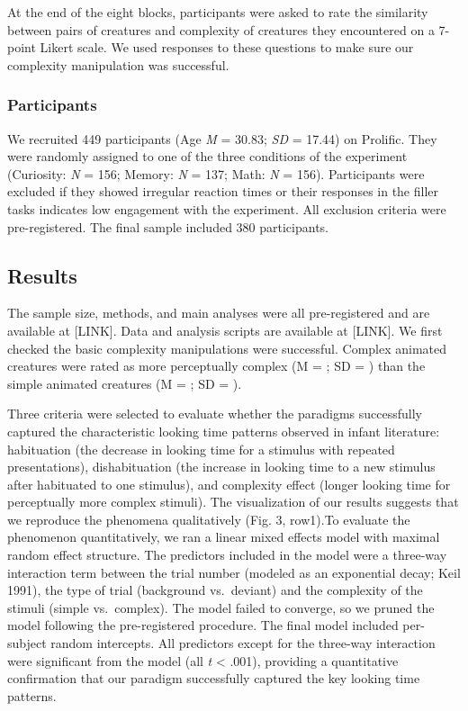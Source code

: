 \documentclass[10pt, letterpaper]{article}
\begin{document}
At the end of the eight blocks, participants were asked to rate the
similarity between pairs of creatures and complexity of creatures they
encountered on a 7-point Likert scale. We used responses to these
questions to make sure our complexity manipulation was successful.

\hypertarget{participants}{%
\subsubsection{Participants}\label{participants}}

We recruited 449 participants (Age \emph{M} = 30.83; \emph{SD} = 17.44)
on Prolific. They were randomly assigned to one of the three conditions
of the experiment (Curiosity: \emph{N} = 156; Memory: \emph{N} = 137;
Math: \emph{N} = 156). Participants were excluded if they showed
irregular reaction times or their responses in the filler tasks
indicates low engagement with the experiment. All exclusion criteria
were pre-registered. The final sample included 380 participants.

\hypertarget{results}{%
\subsection{Results}\label{results}}

The sample size, methods, and main analyses were all pre-registered and
are available at {[}LINK{]}. Data and analysis scripts are available at
{[}LINK{]}. We first checked the basic complexity manipulations were
successful. Complex animated creatures were rated as more perceptually
complex (M = ; SD = ) than the simple animated creatures (M = ; SD = ).

Three criteria were selected to evaluate whether the paradigms
successfully captured the characteristic looking time patterns observed
in infant literature: habituation (the decrease in looking time for a
stimulus with repeated presentations), dishabituation (the increase in
looking time to a new stimulus after habituated to one stimulus), and
complexity effect (longer looking time for perceptually more complex
stimuli). The visualization of our results suggests that we reproduce
the phenomena qualitatively (Fig. 3, row1).To evaluate the phenomenon
quantitatively, we ran a linear mixed effects model with maximal random
effect structure. The predictors included in the model were a three-way
interaction term between the trial number (modeled as an exponential
decay; Keil 1991), the type of trial (background vs.~deviant) and the
complexity of the stimuli (simple vs.~complex). The model failed to
converge, so we pruned the model following the pre-registered procedure.
The final model included per-subject random intercepts. All predictors
except for the three-way interaction were significant from the model
(all \emph{t} \textless{} .001), providing a quantitative confirmation
that our paradigm successfully captured the key looking time patterns.
\end{document}
